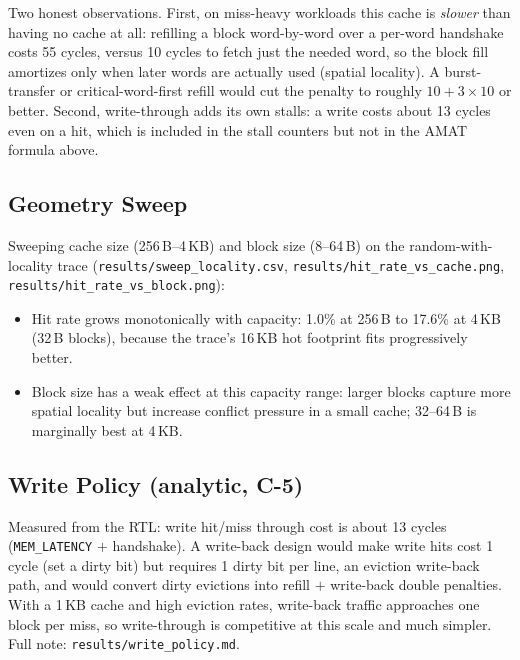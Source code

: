 \documentclass[conference]{IEEEtran}
\begin{document}
Two honest observations. First, on miss-heavy workloads this cache is
\emph{slower} than having no cache at all: refilling a block word-by-word
over a per-word handshake costs 55 cycles, versus 10 cycles to fetch just the
needed word, so the block fill amortizes only when later words are actually
used (spatial locality). A burst-transfer or critical-word-first refill
would cut the penalty to roughly $10 + 3 \times 10$ or better. Second,
write-through adds its own stalls: a write costs about 13 cycles even on a
hit, which is included in the stall counters but not in the AMAT formula
above.

\subsection{Geometry Sweep}
Sweeping cache size (256\,B--4\,KB) and block size (8--64\,B) on the
random-with-locality trace (\texttt{results/sweep\_locality.csv},
\texttt{results/hit\_rate\_vs\_cache.png}, \texttt{results/hit\_rate\_vs\_block.png}):
\begin{itemize}
  \item Hit rate grows monotonically with capacity: 1.0\% at 256\,B to
        17.6\% at 4\,KB (32\,B blocks), because the trace's 16\,KB hot
        footprint fits progressively better.
  \item Block size has a weak effect at this capacity range: larger blocks
        capture more spatial locality but increase conflict pressure in a
        small cache; 32--64\,B is marginally best at 4\,KB.
\end{itemize}

\subsection{Write Policy (analytic, C-5)}
Measured from the RTL: write hit/miss through cost is about 13 cycles
(\texttt{MEM\_LATENCY} $+$ handshake). A write-back design would make write
hits cost 1 cycle (set a dirty bit) but requires 1 dirty bit per line, an
eviction write-back path, and would convert dirty evictions into
refill $+$ write-back double penalties. With a 1\,KB cache and high eviction
rates, write-back traffic approaches one block per miss, so write-through is
competitive at this scale and much simpler. Full note:
\texttt{results/write\_policy.md}.
\end{document}
